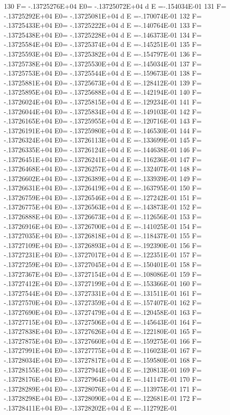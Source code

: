  130 F= -.13725276E+04 E0= -.13725072E+04  d E =-.154034E-01
 131 F= -.13725292E+04 E0= -.13725081E+04  d E =-.170074E-01
 132 F= -.13725433E+04 E0= -.13725222E+04  d E =-.140764E-01
 133 F= -.13725438E+04 E0= -.13725228E+04  d E =-.146373E-01
 134 F= -.13725584E+04 E0= -.13725374E+04  d E =-.145251E-01
 135 F= -.13725593E+04 E0= -.13725382E+04  d E =-.154797E-01
 136 F= -.13725738E+04 E0= -.13725530E+04  d E =-.145034E-01
 137 F= -.13725753E+04 E0= -.13725544E+04  d E =-.159673E-01
 138 F= -.13725881E+04 E0= -.13725673E+04  d E =-.128412E-01
 139 F= -.13725895E+04 E0= -.13725688E+04  d E =-.142194E-01
 140 F= -.13726024E+04 E0= -.13725815E+04  d E =-.129234E-01
 141 F= -.13726044E+04 E0= -.13725834E+04  d E =-.149103E-01
 142 F= -.13726165E+04 E0= -.13725955E+04  d E =-.120716E-01
 143 F= -.13726191E+04 E0= -.13725980E+04  d E =-.146530E-01
 144 F= -.13726324E+04 E0= -.13726113E+04  d E =-.133699E-01
 145 F= -.13726335E+04 E0= -.13726124E+04  d E =-.144638E-01
 146 F= -.13726451E+04 E0= -.13726241E+04  d E =-.116236E-01
 147 F= -.13726468E+04 E0= -.13726257E+04  d E =-.132407E-01
 148 F= -.13726602E+04 E0= -.13726389E+04  d E =-.133939E-01
 149 F= -.13726631E+04 E0= -.13726419E+04  d E =-.163795E-01
 150 F= -.13726759E+04 E0= -.13726546E+04  d E =-.127242E-01
 151 F= -.13726775E+04 E0= -.13726563E+04  d E =-.143873E-01
 152 F= -.13726888E+04 E0= -.13726673E+04  d E =-.112656E-01
 153 F= -.13726916E+04 E0= -.13726700E+04  d E =-.141025E-01
 154 F= -.13727035E+04 E0= -.13726818E+04  d E =-.118437E-01
 155 F= -.13727109E+04 E0= -.13726893E+04  d E =-.192390E-01
 156 F= -.13727231E+04 E0= -.13727017E+04  d E =-.122351E-01
 157 F= -.13727259E+04 E0= -.13727045E+04  d E =-.150401E-01
 158 F= -.13727367E+04 E0= -.13727154E+04  d E =-.108086E-01
 159 F= -.13727412E+04 E0= -.13727199E+04  d E =-.153366E-01
 160 F= -.13727544E+04 E0= -.13727331E+04  d E =-.131511E-01
 161 F= -.13727570E+04 E0= -.13727359E+04  d E =-.157407E-01
 162 F= -.13727690E+04 E0= -.13727479E+04  d E =-.120458E-01
 163 F= -.13727715E+04 E0= -.13727506E+04  d E =-.145643E-01
 164 F= -.13727838E+04 E0= -.13727626E+04  d E =-.122180E-01
 165 F= -.13727875E+04 E0= -.13727660E+04  d E =-.159275E-01
 166 F= -.13727991E+04 E0= -.13727775E+04  d E =-.116023E-01
 167 F= -.13728034E+04 E0= -.13727817E+04  d E =-.159580E-01
 168 F= -.13728155E+04 E0= -.13727944E+04  d E =-.120813E-01
 169 F= -.13728176E+04 E0= -.13727964E+04  d E =-.141147E-01
 170 F= -.13728289E+04 E0= -.13728076E+04  d E =-.113975E-01
 171 F= -.13728298E+04 E0= -.13728090E+04  d E =-.122681E-01
 172 F= -.13728411E+04 E0= -.13728202E+04  d E =-.112792E-01
